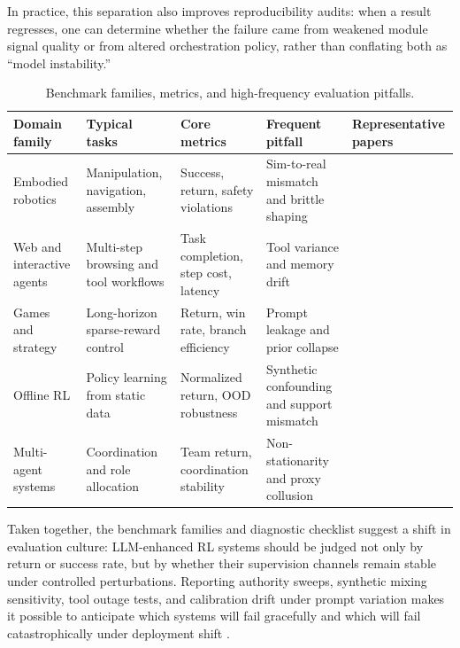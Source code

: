 ﻿\documentclass[conference]{IEEEtran}
\begin{document}
In practice, this separation also improves reproducibility audits: when a result regresses, one can determine whether the failure came from weakened module signal quality or from altered orchestration policy, rather than conflating both as ``model instability.''

\begin{table}[t]
\centering
\small
\setlength{\tabcolsep}{4pt}
\begin{tabularx}{\textwidth}{P{1.9cm}P{2.5cm}P{2.1cm}P{2.2cm}Y}
\toprule
\textbf{Domain family} & \textbf{Typical tasks} & \textbf{Core metrics} & \textbf{Frequent pitfall} & \textbf{Representative papers}\\
\midrule
Embodied robotics & Manipulation, navigation, assembly & Success, return, safety violations & Sim-to-real mismatch and brittle shaping & \cite{arxiv_p_2204_01691,arxiv_p_2602_02454,arxiv_p_2602_12099}\\
Web and interactive agents & Multi-step browsing and tool workflows & Task completion, step cost, latency & Tool variance and memory drift & \cite{arxiv_p_2404_03648,arxiv_p_2601_02439,arxiv_p_2601_03555}\\
Games and strategy & Long-horizon sparse-reward control & Return, win rate, branch efficiency & Prompt leakage and prior collapse & \cite{arxiv_p_2305_16291,arxiv_p_2602_07848,arxiv_p_2602_14234}\\
Offline RL & Policy learning from static data & Normalized return, OOD robustness & Synthetic confounding and support mismatch & \cite{arxiv_p_2310_20587,arxiv_p_2505_18098,arxiv_p_2601_08107}\\
Multi-agent systems & Coordination and role allocation & Team return, coordination stability & Non-stationarity and proxy collusion & \cite{arxiv_p_2304_07297,arxiv_p_2602_08335,arxiv_p_2602_11583}\\
\bottomrule
\end{tabularx}
\caption{Benchmark families, metrics, and high-frequency evaluation pitfalls.}
\label{tab:t5_benchmarks}
\end{table}

Taken together, the benchmark families and diagnostic checklist suggest a shift in evaluation culture: LLM-enhanced RL systems should be judged not only by return or success rate, but by whether their supervision channels remain stable under controlled perturbations. Reporting authority sweeps, synthetic mixing sensitivity, tool outage tests, and calibration drift under prompt variation makes it possible to anticipate which systems will fail gracefully and which will fail catastrophically under deployment shift \cite{arxiv_p_2411_02337,arxiv_p_2601_12762,arxiv_p_2602_06493,arxiv_p_2602_02454}.
\end{document}

